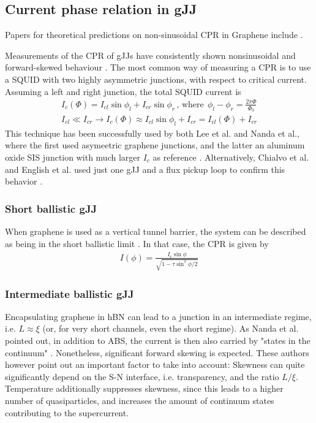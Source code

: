 \subsection{Current phase relation in gJJ}
Papers for theoretical predictions on non-sinusoidal CPR in Graphene include \cite{titov_josephson_2006,black-schafferSelfconsistentSolutionProximity2008,girit_current_2009,black-schafferStronglyAnharmonicCurrentphase2010,hagymasiJosephsonCurrentBallistic2010} .

Measurements of the CPR of gJJs have consistently shown nonsinusoidal and forward-skewed behaviour \cite{chialvoCurrentphaseRelationGraphene2010,lee_ultimately_2015,english_observation_2016,nanda_currentphase_2017}.
The most common way of measuring a CPR is to use a SQUID with two highly asymmetric junctions, with respect to critical current.
Assuming a left and right junction, the total SQUID current is
\begin{eqnarray}
I_c(\Phi)=I_{cl}\sin\phi_l + I_{cr}\sin\phi_r \,\mathrm{,\,where\,}\; \phi_l - \phi_r = \frac{2\pi\Phi}{\Phi_0} \\%
I_{cl} \ll I_{cr} \rightarrow I_c(\Phi) \approx I_{cl}\sin\phi_l + I_{cr} = I_{cl}(\Phi) + I_{cr}
\end{eqnarray}
This technique has been successfully used by both Lee et al. and Nanda et al., where the first used asymeetric graphene junctions, and the latter an aluminum oxide SIS junction with much larger $I_c$ as reference \cite{lee_ultimately_2015,nanda_currentphase_2017}.
Alternatively, Chialvo et al. and English et al. used just one gJJ and a flux pickup loop to confirm this behavior \cite{chialvoCurrentphaseRelationGraphene2010,english_observation_2016}.

\subsubsection{Short ballistic gJJ}
When graphene is used as a vertical tunnel barrier, the system can be described as being in the short ballistic limit \cite{lee_ultimately_2015}.
In that case, the CPR is given by
\begin{eqnarray}
I(\phi)=\frac{I_c\sin\phi}{\sqrt{1-\tau\sin^2\phi/2}}
\end{eqnarray}

\subsubsection{Intermediate ballistic gJJ}
Encapsulating graphene in hBN can lead to a junction in an intermediate regime, i.e. $L\approx\xi$ (or, for very short channels, even the short regime).
As Nanda et al. pointed out, in addition to ABS, the current is then also carried by "states in the continuum" \cite{nanda_currentphase_2017}.
Nonetheless, significant forward skewing is expected.
These authors however point out an important factor to take into account:
Skewness can quite significantly depend on the S-N interface, i.e. transparency, and the ratio $L/\xi$.
Temperature additionally suppresses skewness, since this leads to a higher number of quasiparticles, and increases the amount of continuum states contributing to the supercurrent.


